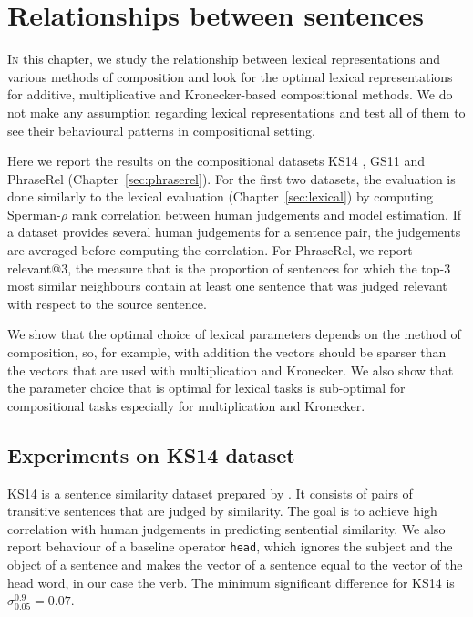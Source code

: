 \chapter{Relationships between sentences}
\label{sec:sentential}

\lettrine[lines=5,loversize=0.25]{I}{n} this chapter, we study the relationship between lexical representations and various methods of composition and look for the optimal lexical representations for additive, multiplicative and Kronecker-based compositional methods.\footnotemark{} We do not make any assumption regarding lexical representations and test all of them to see their behavioural patterns in compositional setting.


Here we report the results on the compositional datasets KS14 \cite{kartsadrqpl2014}, GS11 \cite{Grefenstette:2011:ETV:2140490.2140497} and PhraseRel (Chapter~\ref{sec:phraserel}). For the first two datasets, the evaluation is done similarly to the lexical evaluation (Chapter~\ref{sec:lexical}) by computing Sperman-$\rho$ rank correlation between human judgements and model estimation. If a dataset provides several human judgements for a sentence pair, the judgements are averaged before computing the correlation. For PhraseRel, we report relevant@3, the measure that is the proportion of sentences for which the top-3 most similar neighbours contain at least one sentence that was judged relevant with respect to the source sentence.

We show that the optimal choice of lexical parameters depends on the method of composition, so, for example, with addition the vectors should be sparser than the vectors that are used with multiplication and Kronecker. We also show that the parameter choice that is optimal for lexical tasks is sub-optimal for compositional tasks especially for multiplication and Kronecker. 

\section{Experiments on KS14 dataset}
\label{sec:ks14}

KS14 is a sentence similarity dataset prepared by \citet{kartsadrqpl2014}. It consists of pairs of transitive sentences that are judged by similarity. The goal is to achieve high correlation with human judgements in predicting sentential similarity. We also report behaviour of a baseline operator \texttt{head}, which ignores the subject and the object of a sentence and makes the vector of a sentence equal to the vector of the head word, in our case the verb. The minimum significant difference for KS14 is $\sigma^{0.9}_{0.05} = 0.07$.


